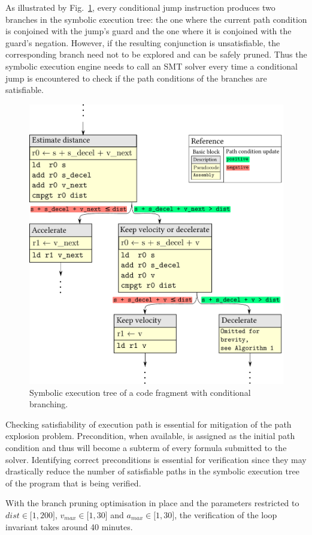 As illustrated by Fig.~\ref{fig-sym-tree}, every conditional jump instruction produces
two branches in the symbolic execution tree: the one
where the current path condition is conjoined with the jump's guard and the one where it is
conjoined with the guard's negation. However, if the resulting
conjunction is unsatisfiable, the corresponding branch need not to be explored
and can be safely pruned.
Thus the symbolic execution engine needs to call an SMT solver every
time a conditional jump is encountered to check if the path conditions of the branches
are satisfiable.

\begin{figure}
\centerline{\includegraphics[scale=0.4]{fig/sym-tree.pdf}}
\caption{Symbolic execution tree of a code fragment with conditional branching.\label{fig-sym-tree}}
\end{figure}

Checking satisfiability of execution path is essential for mitigation of the path explosion
problem. Precondition, when available, is assigned as the initial path condition and thus
will become a subterm of every formula submitted to the solver.
Identifying correct preconditions is essential for verification since they may
drastically reduce the number of satisfiable paths in the symbolic execution tree
of the program that is being verified.

With the branch pruning optimisation in place and the parameters restricted
to $dist \in \mathopen[1, 200\mathclose]$, $v_{max} \in \mathopen[1, 30\mathclose]$ and
$a_{max} \in \mathopen[1, 30\mathclose]$, the verification of the loop invariant
takes around 40 minutes.
